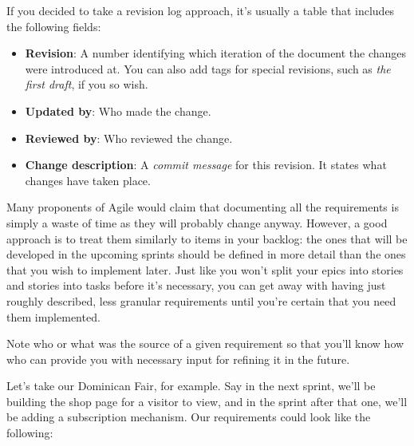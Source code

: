 If you decided to take a revision log approach, it's usually a table that includes the following fields:


\begin{itemize}
\item 
\textbf{Revision}: A number identifying which iteration of the document the changes were introduced at. You can also add tags for special revisions, such as \textit{the first draft}, if you so wish.

\item 
\textbf{Updated by}: Who made the change.

\item 
\textbf{Reviewed by}: Who reviewed the change.

\item
\textbf{Change description}: A \textit{commit message} for this revision. It states what changes have taken place.

\end{itemize}


Many proponents of Agile would claim that documenting all the requirements is simply a waste of time as they will probably change anyway. However, a good approach is to treat them similarly to items in your backlog: the ones that will be developed in the upcoming sprints should be defined in more detail than the ones that you wish to implement later. Just like you won't split your epics into stories and stories into tasks before it's necessary, you can get away with having just roughly described, less granular requirements until you're certain that you need them implemented.

\begin{tcolorbox}[colback=webgreen!5!white,colframe=webgreen!75!black, title=TIP]
\hspace*{0.7cm}Note who or what was the source of a given requirement so that you'll know how who can provide you with necessary input for refining it in the future.
\end{tcolorbox}

Let's take our Dominican Fair, for example. Say in the next sprint, we'll be building the shop page for a visitor to view, and in the sprint after that one, we'll be adding a subscription mechanism. Our requirements could look like the following:

